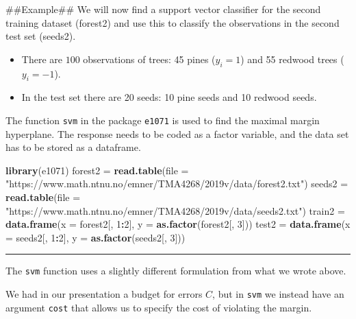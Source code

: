 \documentclass[]{article}
\newenvironment{Shaded}{\begin{snugshade}}{\end{snugshade}}
\newcommand{\DataTypeTok}[1]{\textcolor[rgb]{0.13,0.29,0.53}{#1}}
\newcommand{\DecValTok}[1]{\textcolor[rgb]{0.00,0.00,0.81}{#1}}
\newcommand{\KeywordTok}[1]{\textcolor[rgb]{0.13,0.29,0.53}{\textbf{#1}}}
\newcommand{\NormalTok}[1]{#1}
\newcommand{\OperatorTok}[1]{\textcolor[rgb]{0.81,0.36,0.00}{\textbf{#1}}}
\newcommand{\StringTok}[1]{\textcolor[rgb]{0.31,0.60,0.02}{#1}}
\providecommand{\tightlist}{%
  \setlength{\itemsep}{0pt}\setlength{\parskip}{0pt}}
\begin{document}
\#\#Example\#\# We will now find a support vector classifier for the
second training dataset (forest2) and use this to classify the
observations in the second test set (seeds2).

\begin{itemize}
\tightlist
\item
  There are \(100\) observations of trees: 45 pines (\(y_i=1\)) and 55
  redwood trees (\(y_i=-1\)).
\item
  In the test set there are 20 seeds: 10 pine seeds and 10 redwood
  seeds.
\end{itemize}

The function \texttt{svm} in the package \texttt{e1071} is used to find
the maximal margin hyperplane. The response needs to be coded as a
factor variable, and the data set has to be stored as a dataframe.

\footnotesize

\begin{Shaded}
\begin{Highlighting}[]
\KeywordTok{library}\NormalTok{(e1071)}
\NormalTok{forest2 =}\StringTok{ }\KeywordTok{read.table}\NormalTok{(}\DataTypeTok{file =} \StringTok{"https://www.math.ntnu.no/emner/TMA4268/2019v/data/forest2.txt"}\NormalTok{)}
\NormalTok{seeds2 =}\StringTok{ }\KeywordTok{read.table}\NormalTok{(}\DataTypeTok{file =} \StringTok{"https://www.math.ntnu.no/emner/TMA4268/2019v/data/seeds2.txt"}\NormalTok{)}
\NormalTok{train2 =}\StringTok{ }\KeywordTok{data.frame}\NormalTok{(}\DataTypeTok{x =}\NormalTok{ forest2[, }\DecValTok{1}\OperatorTok{:}\DecValTok{2}\NormalTok{], }\DataTypeTok{y =} \KeywordTok{as.factor}\NormalTok{(forest2[, }\DecValTok{3}\NormalTok{]))}
\NormalTok{test2 =}\StringTok{ }\KeywordTok{data.frame}\NormalTok{(}\DataTypeTok{x =}\NormalTok{ seeds2[, }\DecValTok{1}\OperatorTok{:}\DecValTok{2}\NormalTok{], }\DataTypeTok{y =} \KeywordTok{as.factor}\NormalTok{(seeds2[, }\DecValTok{3}\NormalTok{]))}
\end{Highlighting}
\end{Shaded}

\normalsize

\begin{center}\rule{0.5\linewidth}{\linethickness}\end{center}

The \texttt{svm} function uses a slightly different formulation from
what we wrote above.

We had in our presentation a budget for errors \(C\), but in
\texttt{svm} we instead have an argument \texttt{cost} that allows us to
specify the cost of violating the margin.
\end{document}
